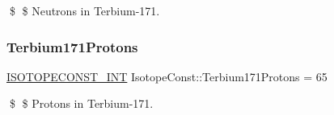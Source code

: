 \$ \$ Neutrons in Terbium-\/171. \mbox{\label{group___isotope_const-_terbium-_tb171_ga88cc539d724c8198e06b6ed72c91613f}} 
\subsubsection{\texorpdfstring{Terbium171\+Protons}{Terbium171Protons}}
{\footnotesize\ttfamily \mbox{\hyperlink{group___isotope_const-_macros_ga5f18360b3e99483a35c32d789e62621c}{I\+S\+O\+T\+O\+P\+E\+C\+O\+N\+S\+T\+\_\+\+I\+NT}} Isotope\+Const\+::\+Terbium171\+Protons = 65}

\$ \$ Protons in Terbium-\/171. 